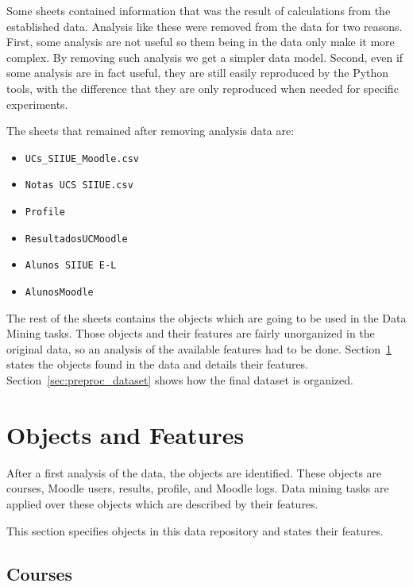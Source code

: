 Some sheets contained information that was the result of calculations from the
established data. Analysis like these were removed from the data for two
reasons. First, some analysis are not useful so them being in the data only
make it more complex. By removing such analysis we get a simpler data
model. Second, even if some analysis are in fact useful, they are still easily
reproduced by the Python tools, with the difference that they are only
reproduced when needed for specific experiments.

The sheets that remained after removing analysis data are:

\begin{itemize}
    \item \texttt{UCs\_SIIUE\_Moodle.csv}
    \item \texttt{Notas UCS SIIUE.csv}
    \item \texttt{Profile}
    \item \texttt{ResultadosUCMoodle}
    \item \texttt{Alunos SIIUE E-L}
    \item \texttt{AlunosMoodle}
\end{itemize}

The rest of the sheets contains the objects which are going to be used in the
Data Mining tasks. Those objects and their features are fairly unorganized in
the original data, so an analysis of the available features had to be done.
Section~\ref{sec:objs_feat} states the objects found in the data and details
their features. Section~\ref{sec:preproc_dataset} shows how the final dataset
is organized.

\section{Objects and Features}
\label{sec:objs_feat}

After a first analysis of the data, the objects are identified. These objects
are courses, Moodle users, results, profile, and Moodle logs. Data mining tasks
are applied over these objects which are described by their features.

This section specifies objects in this data repository and states their
features.

\subsection{Courses}
\label{sec:data_courses}

